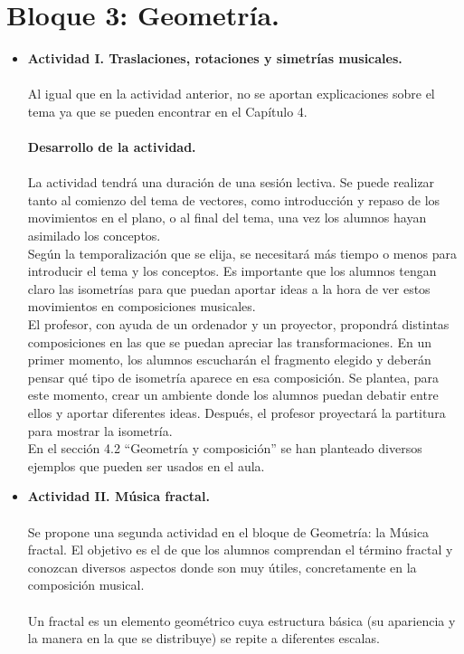 \documentclass[a4paper, openright, 11pt, titlepage]{report}
\theoremstyle{definition}\newtheorem{defin}[propo]{Definition}
\theoremstyle{definition}\newtheorem{obser}[propo]{Remark}
\theoremstyle{definition}\newtheorem{ejem}[propo]{Ejemplo}
\theoremstyle{definition}\newtheorem{algoritmo}[propo]{Algoritmo}
\begin{document}
\section{Bloque 3: Geometría.}
\begin{itemize}
    \item \textbf{Actividad I. Traslaciones, rotaciones y simetrías musicales.}\\\\
    Al igual que en la actividad anterior, no se aportan explicaciones sobre el tema ya que se pueden encontrar en el Capítulo 4.\\\\
    \textbf{Desarrollo de la actividad.}\\\\
    La actividad tendrá una duración de una sesión lectiva. Se puede realizar tanto al comienzo del tema de vectores, como introducción y repaso de los movimientos en el plano, o al final del tema, una vez los alumnos hayan asimilado los conceptos.\\
    Según la temporalización que se elija, se necesitará más tiempo o menos para introducir el tema y los conceptos. Es importante que los alumnos tengan claro las isometrías para que puedan aportar ideas a la hora de ver estos movimientos en composiciones musicales.\\
    El profesor, con ayuda de un ordenador y un proyector, propondrá distintas composiciones en las que se puedan apreciar las transformaciones. En un primer momento, los alumnos escucharán el fragmento elegido y deberán pensar qué tipo de isometría aparece en esa composición. Se plantea, para este momento, crear un ambiente donde los alumnos puedan debatir entre ellos y aportar diferentes ideas. Después, el profesor proyectará la partitura para mostrar la isometría.\\
    En el sección 4.2 ``Geometría y composición'' se han planteado diversos ejemplos que pueden ser usados en el aula.
    \item \textbf{Actividad II. Música fractal.}\\\\
    Se propone una segunda actividad en el bloque de Geometría: la Música fractal. El objetivo es el de que los alumnos comprendan el término fractal y conozcan diversos aspectos donde son muy útiles, concretamente en la composición musical.\\\\
    Un fractal es un elemento geométrico cuya estructura básica (su apariencia y la manera en la que se distribuye) se repite a diferentes escalas.\\

\end{itemize}
\end{document}
